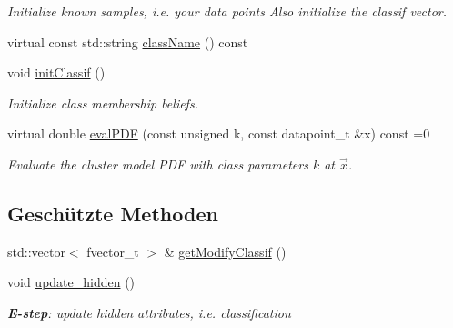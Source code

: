 \begin{DoxyCompactItemize}
\begin{DoxyCompactList}\small\item\em Initialize known samples, i.e. your data points Also initialize the classif vector. \item\end{DoxyCompactList}\item 
virtual const std::string \hyperlink{classCDA_1_1FitMulticlassByEM_a885947f2c93b4a05cb3eb153d774cb75}{className} () const 
\item 
void \hyperlink{classCDA_1_1FitMulticlassByEM_aceb43b0a386c8f8e112562cc3288b23d}{initClassif} ()
\begin{DoxyCompactList}\small\item\em Initialize class membership beliefs. \item\end{DoxyCompactList}\item 
virtual double \hyperlink{classCDA_1_1FitMulticlassByEM_a747d8926ab25896e4a5db08b169fccde}{evalPDF} (const unsigned k, const datapoint\_\-t \&x) const =0
\begin{DoxyCompactList}\small\item\em Evaluate the cluster model PDF with class parameters $k$ at $\vec{x}$. \item\end{DoxyCompactList}\end{DoxyCompactItemize}
\subsection*{Geschützte Methoden}
\begin{DoxyCompactItemize}
\item 
std::vector$<$ fvector\_\-t $>$ \& \hyperlink{classCDA_1_1FitMulticlassByEM_a07c7f0fb577bb28b7987e80bb93d6707}{getModifyClassif} ()
\item 
void \hyperlink{classCDA_1_1FitMulticlassByEM_a7c40c5528a4b8b32e2455056f60d76de}{update\_\-hidden} ()
\begin{DoxyCompactList}\small\item\em {\bfseries E-\/step}: update hidden attributes, i.e. classification \item\end{DoxyCompactList}\end{DoxyCompactItemize}
